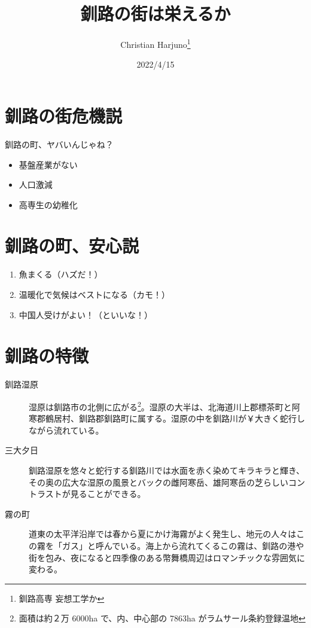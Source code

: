 \documentclass[a4j, twocolumn]{jarticle}
\begin{document}
\title{釧路の街は栄えるか}
\author{Christian Harjuno\thanks{釧路高専 妄想工学か}}
\date{2022/4/15}

\maketitle

\section{釧路の街危機説}
釧路の町、ヤバいんじゃね？
\begin{itemize}
  \item 基盤産業がない
  \item 人口激減
  \item 高専生の幼稚化
\end{itemize}

\section{釧路の町、安心説}
\begin{enumerate}
  \item 魚まくる（ハズだ！）\cite{GYOGUN}
  \item 温暖化で気候はベストになる（カモ！）
  \item 中国人受けがよい！（といいな！）
\end{enumerate}

\section{釧路の特徴}
\begin{description}
  \item[釧路湿原] 湿原は釧路市の北側に広がる\footnote{面積は約２万 6000ha で、内、中心部の 7863ha がラムサール条約登録温地}。湿原の大半は、北海道川上郡標茶町と阿寒郡鶴居村、釧路郡釧路町に属する。湿原の中を釧路川が￥大きく蛇行しながら流れている\cite{KANKYOU}。
  \item[三大夕日] 釧路湿原を悠々と蛇行する釧路川では水面を赤く染めてキラキラと輝き、その奥の広大な湿原の風景とバックの雌阿寒岳、雄阿寒岳の芝らしいコントラストが見ることができる\cite{KANKYOU}。
  \item[霧の町] 道東の太平洋沿岸では春から夏にかけ海霧がよく発生し、地元の人々はこの霧を「ガス」と呼んでいる。海上から流れてくるこの霧は、釧路の港や街を包み、夜になると四季像のある幣舞橋周辺はロマンチックな雰囲気に変わる\cite{KANKYOU}。 
\end{description}
\end{document}
